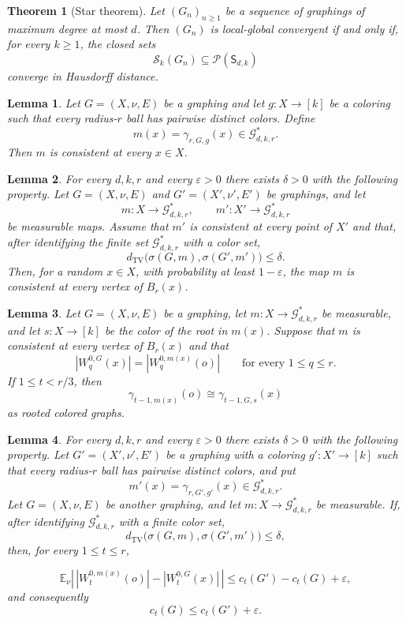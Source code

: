 \documentclass[10pt,a4paper]{amsart}
\newtheorem{theorem}{Theorem}
\newtheorem{lemma}{Lemma}
\newcommand{\E}{\mathbb E}
\newcommand{\TV}{\operatorname{TV}}
\newcommand{\calG}{\mathcal G}
\newcommand{\calP}{\mathcal P}
\newcommand{\calS}{\mathcal S}
\begin{document}
\begin{theorem}[Star theorem]\label{thm:main}
Let $(G_n)_{n\geq 1}$ be a sequence of graphings of maximum degree at most $d$.  Then $(G_n)$ is local-global convergent if and only if, for every $k\geq 1$, the closed sets
\[
 \calS_k(G_n)\subseteq\calP(\mathsf S_{d,k})
\]
converge in Hausdorff distance.
\end{theorem}

\begin{lemma}\label{lem:true-neighbourhoods-consistent}
Let $G=(X,\nu,E)$ be a graphing and let $g\colon X\to[k]$ be a coloring such that every radius-$r$ ball has pairwise distinct colors.  Define
\[
 m(x)=\gamma_{r,G,g}(x)\in\calG^*_{d,k,r}.
\]
Then $m$ is consistent at every $x\in X$.
\end{lemma}

\begin{lemma}\label{lem:consistency-from-stars}
For every $d,k,r$ and every $\varepsilon>0$ there exists $\delta>0$ with the following property.  Let $G=(X,\nu,E)$ and $G'=(X',\nu',E')$ be graphings, and let
\[
 m\colon X\to\calG^*_{d,k,r},\qquad m'\colon X'\to\calG^*_{d,k,r}
\]
be measurable maps.  Assume that $m'$ is consistent at every point of $X'$ and that, after identifying the finite set $\calG^*_{d,k,r}$ with a color set,
\[
 d_{\TV}\bigl(\sigma(G,m),\sigma(G',m')\bigr)\leq\delta.
\]
Then, for a random $x\in X$, with probability at least $1-\varepsilon$, the map $m$ is consistent at every vertex of $B_r(x)$.
\end{lemma}

\begin{lemma}\label{lem:isomorphism-from-closed-walks}
Let $G=(X,\nu,E)$ be a graphing, let $m\colon X\to\calG^*_{d,k,r}$ be measurable, and let $s\colon X\to[k]$ be the color of the root in $m(x)$.  Suppose that $m$ is consistent at every vertex of $B_r(x)$ and that
\[
 |W_{q}^{0,G}(x)|=|W_{q}^{0,m(x)}(o)|
 \qquad\text{for every }1\leq q\leq r.
\]
If $1\leq t<r/3$, then
\[
 \gamma_{t-1,m(x)}(o)\cong \gamma_{t-1,G,s}(x)
\]
as rooted colored graphs.
\end{lemma}

\begin{lemma}\label{lem:closed-walk-stability}
For every $d,k,r$ and every $\varepsilon>0$ there exists $\delta>0$ with the following property.  Let $G'=(X',\nu',E')$ be a graphing with a coloring $g'\colon X'\to[k]$ such that every radius-$r$ ball has pairwise distinct colors, and put
\[
 m'(x)=\gamma_{r,G',g'}(x)\in\calG^*_{d,k,r}.
\]
Let $G=(X,\nu,E)$ be another graphing, and let $m\colon X\to\calG^*_{d,k,r}$ be measurable.  If, after identifying $\calG^*_{d,k,r}$ with a finite color set,
\[
 d_{\TV}\bigl(\sigma(G,m),\sigma(G',m')\bigr)\leq\delta,
\]
then, for every $1\leq t\leq r$,

\[
 \E_\nu\left|\,|W_t^{0,m(x)}(o)|-|W_t^{0,G}(x)|\,\right|
 \leq c_t(G')-c_t(G)+\varepsilon,
\]
and consequently
\[
 c_t(G)\leq c_t(G')+\varepsilon.
\]
\end{lemma}
\end{document}
